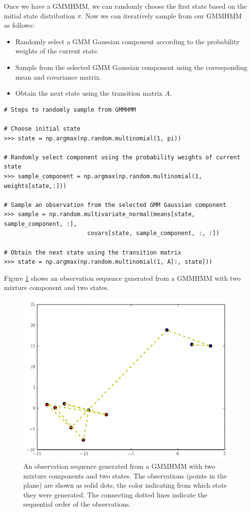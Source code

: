 Once we have a GMMHMM, we can randomly choose the first state based on the initial state distribution $\pi$.
Now we can iteratively sample from our GMMHMM as follows:
\begin{itemize}
\item Randomly select a GMM Gaussian component according to the probability weights of the current state.
\item Sample from the selected GMM Gaussian component using the corresponding mean and covariance matrix.
\item Obtain the next state using the transition matrix $A$.
\end{itemize}

\begin{lstlisting}
# Steps to randomly sample from GMMHMM

# Choose initial state
>>> state = np.argmax(np.random.multinomial(1, pi))

# Randomly select component using the probability weights of current state
>>> sample_component = np.argmax(np.random.multinomial(1, weights[state,:]))

# Sample an observation from the selected GMM Gaussian component 
>>> sample = np.random.multivariate_normal(means[state, sample_component, :], 
                        covars[state, sample_component, :, :])

# Obtain the next state using the transition matrix
>>> state = np.argmax(np.random.multinomial(1, A[:, state]))
\end{lstlisting}

Figure \ref{fig:samples} shows an observation sequence generated from a GMMHMM with two mixture component and two states.

\begin{figure}
\centering
\includegraphics[width=\textwidth]{figures/samples.pdf}
\caption{An observation sequence generated from a GMMHMM with two mixture components and two states.
The observations (points in the plane) are shown as solid dots, the color indicating from which
state they were generated. The connecting dotted lines indicate the sequential order of the observations.}
\label{fig:samples}
\end{figure}

